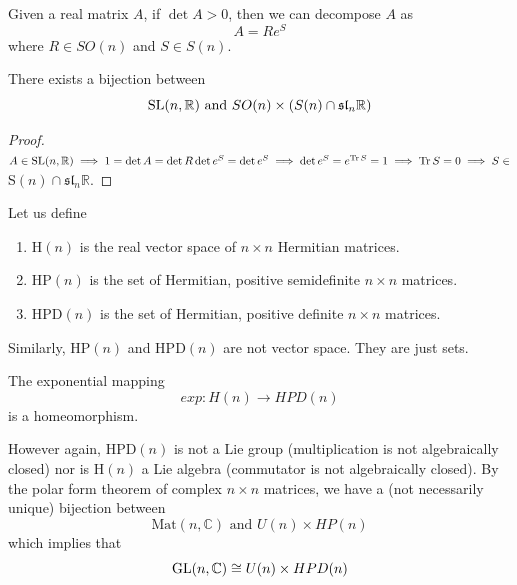   \begin{corollary}
    Given a real matrix $A$, if $\det{A} > 0$, then we can decompose $A$ as
    \begin{equation}
      A = R e^S
    \end{equation}
    where $R \in SO(n)$ and $S \in S(n)$. 
  \end{corollary}

  \begin{corollary}
    There exists a bijection between
    \begin{equation}
      \operatorname{SL}(n, \mathbb{R}) \text{ and } SO(n) \times (S(n) \cap \mathfrak{sl}_n \mathbb{R})
    \end{equation}
  \end{corollary}
  \begin{proof}
    $A \in \operatorname{SL}(n, \mathbb{R}) \implies 1 = \det{A} = \det{R} \det{e^S} = \det{e^S} \implies \det{e^S} = e^{\operatorname{Tr}{S}} = 1 \implies \operatorname{Tr}{S} = 0 \implies S \in$ S$(n) \cap \mathfrak{sl}_n \mathbb{R}$. 
  \end{proof}

  \begin{definition}
    Let us define
    \begin{enumerate}
      \item H$(n)$ is the real vector space of $n \times n$ Hermitian matrices. 
      \item HP$(n)$ is the set of Hermitian, positive semidefinite $n \times n$ matrices. 
      \item HPD$(n)$ is the set of Hermitian, positive definite $n \times n$ matrices. 
    \end{enumerate}
    Similarly, HP$(n)$ and HPD$(n)$ are not vector space. They are just sets. 
  \end{definition}

  \begin{lemma}
    The exponential mapping
    \begin{equation}
      exp: H(n) \longrightarrow HPD(n)
    \end{equation}
    is a homeomorphism. 
  \end{lemma}

  However again, HPD$(n)$ is not a Lie group (multiplication is not algebraically closed) nor is H$(n)$ a Lie algebra (commutator is not algebraically closed). By the polar form theorem of complex $n \times n$ matrices, we have a (not necessarily unique) bijection between
  \begin{equation}
    \text{Mat}(n, \mathbb{C}) \text{ and } U(n) \times HP(n)
  \end{equation}
  which implies that
  \begin{equation}
    \operatorname{GL}(n, \mathbb{C}) \cong U(n) \times HPD (n)
  \end{equation}

